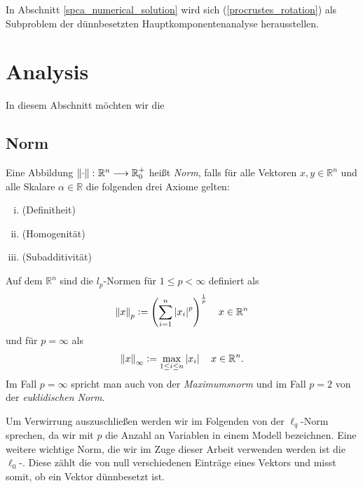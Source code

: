 In Abschnitt \ref{spca_numerical_solution} wird sich (\ref{procrustes_rotation}) als Subproblem der dünnbesetzten Hauptkomponentenanalyse herausstellen.




\section{Analysis}
\label{analysis}

In diesem Abschnitt möchten wir die 

\subsection{Norm}

\begin{defn}
\label{norm}
Eine Abbildung $\left\lVert \cdot \right\rVert \colon \mathbb{R}^n \longrightarrow {\mathbb {R} }_{0}^{+}$ heißt \textit{Norm}, falls für alle Vektoren $x,y\in \mathbb{R}^n$ und alle Skalare $\alpha \in \mathbb{R}$ die folgenden drei Axiome gelten:
\begin{enumerate}[(i)]
\item {}(Definitheit)
\item {}(Homogenität)
\item {}(Subadditivität)
\end{enumerate}
\end{defn}

\begin{defn} 
\label{lp_norm}
Auf dem $\mathbb{R}^n$ sind die $l_p$-Normen für $1 \leq p < \infty$ definiert als
$$\left\lVert x \right\rVert_p \vcentcolon= \left( \sum_{i=1}^{n} \left\lvert x_i \right\rvert^{p} \right) ^{\frac{1}{p}} \quad x \in \mathbb{R}^{n}$$
und für $p = \infty$ als
$$\left\lVert x \right\rVert_{\infty} \vcentcolon= \max_{1 \leq i \leq n} \left\lvert x_i \right\rvert \quad x \in \mathbb{R}^{n}.$$
Im Fall $p = \infty$ spricht man auch von der \textit{Maximumsnorm} und im Fall $p = 2$ von der \textit{euklidischen Norm}.
\end{defn}

Um Verwirrung auszuschließen werden wir im Folgenden von der $\ell_q$-Norm sprechen, da wir mit $p$ die Anzahl an Variablen in einem Modell bezeichnen. Eine weitere wichtige Norm, die wir im Zuge dieser Arbeit verwenden werden ist die $\ell_0$-. Diese zählt die von null verschiedenen Einträge eines Vektors und misst somit, ob ein Vektor dünnbesetzt ist.

